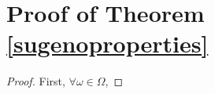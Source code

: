 \section{Proof of Theorem \ref{sugenoproperties}}
\begin{proof}
First, $\forall \omega \in \Omega$, 
\end{proof}
